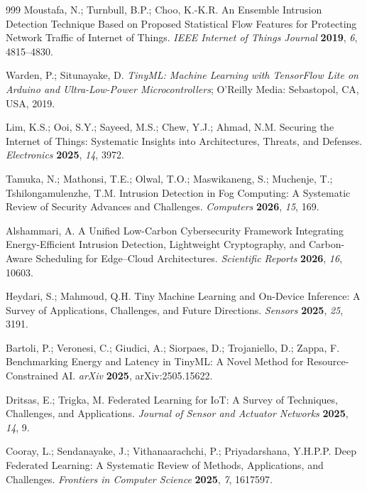 \documentclass[journal,article,submit,moreauthors]{Definitions/mdpi}
\begin{document}
{\begin{thebibliography}{999}
Moustafa, N.; Turnbull, B.P.; Choo, K.-K.R. An Ensemble Intrusion Detection Technique Based on Proposed Statistical Flow Features for Protecting Network Traffic of Internet of Things. \emph{IEEE Internet of Things Journal} \textbf{2019}, \emph{6}, 4815--4830.

Warden, P.; Situnayake, D. \emph{TinyML: Machine Learning with TensorFlow Lite on Arduino and Ultra-Low-Power Microcontrollers}; O'Reilly Media: Sebastopol, CA, USA, 2019.


Lim, K.S.; Ooi, S.Y.; Sayeed, M.S.; Chew, Y.J.; Ahmad, N.M. Securing the Internet of Things: Systematic Insights into Architectures, Threats, and Defenses. \emph{Electronics} \textbf{2025}, \emph{14}, 3972.

Tamuka, N.; Mathonsi, T.E.; Olwal, T.O.; Maswikaneng, S.; Muchenje, T.; Tshilongamulenzhe, T.M. Intrusion Detection in Fog Computing: A Systematic Review of Security Advances and Challenges. \emph{Computers} \textbf{2026}, \emph{15}, 169.

Alshammari, A. A Unified Low-Carbon Cybersecurity Framework Integrating Energy-Efficient Intrusion Detection, Lightweight Cryptography, and Carbon-Aware Scheduling for Edge--Cloud Architectures. \emph{Scientific Reports} \textbf{2026}, \emph{16}, 10603.

Heydari, S.; Mahmoud, Q.H. Tiny Machine Learning and On-Device Inference: A Survey of Applications, Challenges, and Future Directions. \emph{Sensors} \textbf{2025}, \emph{25}, 3191.

Bartoli, P.; Veronesi, C.; Giudici, A.; Siorpaes, D.; Trojaniello, D.; Zappa, F. Benchmarking Energy and Latency in TinyML: A Novel Method for Resource-Constrained AI. \emph{arXiv} \textbf{2025}, arXiv:2505.15622.

Dritsas, E.; Trigka, M. Federated Learning for IoT: A Survey of Techniques, Challenges, and Applications. \emph{Journal of Sensor and Actuator Networks} \textbf{2025}, \emph{14}, 9.

Cooray, L.; Sendanayake, J.; Vithanaarachchi, P.; Priyadarshana, Y.H.P.P. Deep Federated Learning: A Systematic Review of Methods, Applications, and Challenges. \emph{Frontiers in Computer Science} \textbf{2025}, \emph{7}, 1617597.


\end{thebibliography}}
\end{document}
